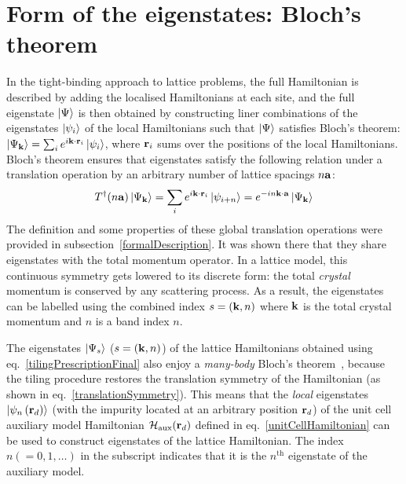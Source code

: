 \documentclass[reprint,hidelinks,onecolumn]{revtex4-2}
\begin{document}
\section{Form of the eigenstates: Bloch's theorem}
In the tight-binding approach to lattice problems, the full Hamiltonian is described by adding the localised Hamiltonians at each site, and the full eigenstate \(\ket{\Psi}\) is then obtained by constructing liner combinations of the eigenstates \(\ket{\psi_i}\) of the local Hamiltonians such that \(\ket{\Psi}\) satisfies Bloch's theorem: \(\ket{\Psi_{\bf k}} = \sum_{i} e^{i {\bf k}\cdot{\bf r}_i} \ket{\psi_i}\), where \({\bf r}_i\) sums over the positions of the local Hamiltonians. Bloch's theorem ensures that eigenstates satisfy the following relation under a translation operation by an arbitrary number of lattice spacings \({n\bf a}\):
\begin{equation}\begin{aligned}
	T^\dagger(n{\bf a})\ket{\Psi_{{\bf k}}} = \sum_{i} e^{i {\bf k}\cdot{\bf r}_i} \ket{\psi_{i + n}} = e^{-in{\bf k}\cdot{\bf a}}\ket{\Psi_{\bf k}}
\end{aligned}\end{equation}
The definition and some properties of these global translation operations were provided in subsection~\ref{formalDescription}. It was shown there that they share eigenstates with the total momentum operator. In a lattice model, this continuous symmetry gets lowered to its discrete form: the total {\it crystal} momentum is conserved by any scattering process. As a result, the eigenstates can be labelled using the combined index \(s = \left({\bf k}, n\right) \) where \({\bf k}\) is the total crystal momentum and \(n\) is a band index \(n\).

The eigenstates \(\ket{\Psi_{s}}\) (\(s = \left({\bf k}, n\right)\)) of the lattice Hamiltonians obtained using eq.~\ref{tilingPrescriptionFinal} also enjoy a {\it many-body} Bloch's theorem~\cite{stoyanova}, because the tiling procedure restores the translation symmetry of the Hamiltonian (as shown in eq.~\ref{translationSymmetry}). This means that the {\it local} eigenstates \(\ket{\psi_n\left({\bf r}_d\right)}\) (with the impurity located at an arbitrary position \({\bf r}_d\)) of the unit cell auxiliary model Hamiltonian \(\mathcal{H}_\text{aux}({\bf r}_d)\) defined in eq.~\ref{unitCellHamiltonian} can be used to construct eigenstates of the lattice Hamiltonian. The index \(n(=0,1,\ldots)\) in the subscript indicates that it is the \(n^\text{th}\) eigenstate of the auxiliary model.
\end{document}
